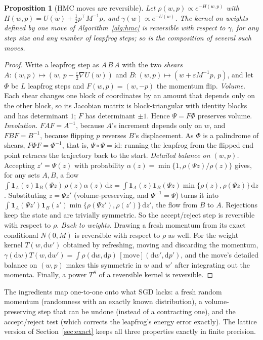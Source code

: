 \documentclass[11pt]{article}
\newtheorem{proposition}[theorem]{Proposition}
\theoremstyle{definition}
\theoremstyle{remark}
\newcommand{\dd}{\mathrm{d}}
\begin{document}
\begin{proposition}[HMC moves are reversible]\label{prop:hmc}
Let $\rho(w,p)\propto e^{-H(w,p)}$ with $H(w,p)=U(w)+\frac12p^\top M^{-1}p$, and $\gamma(w)\propto e^{-U(w)}$. The kernel on weights
defined by one move of Algorithm~\ref{alg:hmc} is reversible with respect to $\gamma$, for any step size and any number of
leapfrog steps; so is the composition of several such moves.
\end{proposition}
\begin{proof}
Write a leapfrog step as $A\,B\,A$ with the two \emph{shears} $A:(w,p)\mapsto(w,\,p-\frac\varepsilon2\nabla U(w))$ and
$B:(w,p)\mapsto(w+\varepsilon M^{-1}p,\,p)$, and let $\Phi$ be $L$ leapfrog steps and $F(w,p)=(w,-p)$ the momentum flip.
\emph{Volume.} Each shear changes one block of coordinates by an amount that depends only on the other block, so its
Jacobian matrix is block-triangular with identity blocks and has determinant $1$; $F$ has determinant $\pm1$. Hence
$\Psi=F\Phi$ preserves volume.
\emph{Involution.} $FAF=A^{-1}$, because $A$'s increment depends only on $w$, and $FBF=B^{-1}$, because flipping $p$ reverses
$B$'s displacement. As $\Phi$ is a palindrome of shears, $F\Phi F=\Phi^{-1}$, that is, $\Psi\circ\Psi=\mathrm{id}$: running
the leapfrog from the flipped end point retraces the trajectory back to the start.
\emph{Detailed balance on $(w,p)$.} Accepting $z'=\Psi(z)$ with probability $\alpha(z)=\min\{1,\rho(\Psi z)/\rho(z)\}$ gives, for
any sets $A,B$, a flow
$\int\mathbf 1_A(z)\mathbf 1_B(\Psi z)\,\rho(z)\alpha(z)\,\dd z=\int\mathbf 1_A(z)\mathbf 1_B(\Psi z)\min\{\rho(z),\rho(\Psi z)\}\,\dd z$.
Substituting $z=\Psi z'$ (volume-preserving, and $\Psi^{-1}=\Psi$) turns it into
$\int\mathbf 1_A(\Psi z')\mathbf 1_B(z')\min\{\rho(\Psi z'),\rho(z')\}\,\dd z'$, the flow from $B$ to $A$. Rejections keep the
state and are trivially symmetric. So the accept/reject step is reversible with respect to $\rho$.
\emph{Back to weights.} Drawing a fresh momentum from its exact conditional $N(0,M)$ is reversible with respect to $\rho$
as well. For the weight kernel $T(w,\dd w')$ obtained by refreshing, moving and discarding the momentum,
$\gamma(\dd w)T(w,\dd w')=\int\rho(\dd w,\dd p)\,[\text{move}](\dd w',\dd p')$, and the move's detailed balance on $(w,p)$ makes this
symmetric in $w$ and $w'$ after integrating out the momenta. Finally, a power $T^S$ of a reversible kernel is reversible.
\end{proof}
The ingredients map one-to-one onto what SGD lacks: a fresh random momentum (randomness with an exactly known
distribution), a volume-preserving step that can be undone (instead of a contracting one), and the accept/reject test
(which corrects the leapfrog's energy error exactly). The lattice version of Section~\ref{sec:exact} keeps all three
properties exactly in finite precision.
\end{document}
